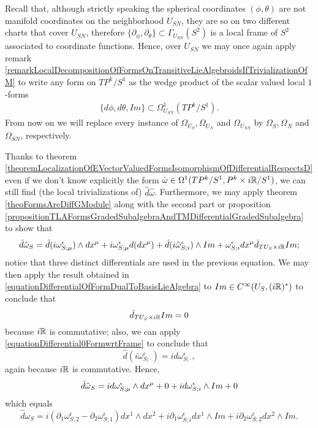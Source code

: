 \begin{example}[$TP^k/S^1$ over $S^2$]
Recall that, although strictly speaking the spherical coordinates $(\phi, \theta)$ are not manifold coordinates on the neighborhood $U_{SN}$, they are so on two different charts that cover $U_{SN}$, therefore $\{\partial_\phi, \partial_\theta\} \subset \Gamma_{U_{SN}}(S^2)$ is a local frame of $S^2$ associated to coordinate functions. Hence, over $U_{SN}$ we may once again apply remark \ref{remarkLocalDecompositionOfFormsOnTransitiveLieAlgebroidsIfTrivializationOfM} to write any form on $TP^k/S^1$ as the wedge product of the scalar valued local $1$-forms
\begin{align*}
    \{d\phi, d\theta, Im\} \subset \Omega^1_{U_{SN}}(TP^k/S^1).
\end{align*} 
From now on we will replace every instance of $\Omega_{U_{S}}, \Omega_{U_{N}}$ and $\Omega_{U_{SN}}$ by $\Omega_{S}, \Omega_{N}$ and $\Omega_{SN}$, respectively.

Thanks to theorem \ref{theoremLocalizationOfEVectorValuedFormsIsomorphismOfDifferentialRespectsD} even if we don't know explicitly the form $\hat \omega \in \Omega^1(TP^k/S^1, P^k \times i\mathbb{R}/S^1)$, we can still find (the local trivializations of) $\hat d \hat \omega$. Furthermore, we may apply theorem \ref{theoFormsAreDiffGModule} along with the second part or proposition \ref{propositionTLAFormsGradedSubalgebraAndTMDifferentialGradedSubalgebra} to show that
    \begin{equation*}
        \hat d \hat \omega_S = \hat d (i\omega^\epsilon_{S;\mu}) \wedge dx^\mu + i  \omega^\epsilon_{S;\mu} d(dx^\mu) + \hat d(i \hat \omega^\epsilon_{S;i}) \wedge Im + \omega^\epsilon_{S;i} dx^\mu \hat d_{TU_S \times i\RR} Im;
    \end{equation*}
notice that three distinct differentials are used in the previous equation. We may then apply the result obtained in \eqref{equationDifferentialOfFormDualToBasisLieAlgebra} to $Im \in C^\infty(U_S, (i \mathbb{R})^*)$ to conclude that 
$$\hat d_{TU_S \times i\mathbb{R}} Im = 0$$
because $i\mathbb{R}$ is commutative; also, we can apply \eqref{equationDifferential0FormwrtFrame} to conclude that
$$ \hat d (i \omega^\epsilon_{S;\cdot}) = i d\omega^\epsilon_{S;\cdot},$$
again because $i\mathbb{R}$ is commutative. Hence,
\begin{equation*}
    \hat d \hat \omega_S = i d\omega^\epsilon_{S;\mu}\wedge dx^\mu + 0 + i d\omega^\epsilon_{S;i} \wedge Im + 0\\
\end{equation*}
which equals
\begin{equation}\label{equationCurvatureGeneralConnectionCh2S2}
    \hat d \omega_S = i(\partial_1 \omega^\epsilon_{S;2} - \partial_2 \omega^\epsilon_{S;1}) dx^1 \wedge dx^2 + i \partial_1 \omega^\epsilon_{S;i} dx^1 \wedge Im + i \partial_2 \omega^\epsilon_{S;2} dx^2 \wedge Im.
\end{equation}

\end{example}

